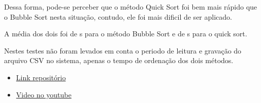 \documentclass[12pt]{article}
\begin{document}
Dessa forma, pode-se perceber que o método Quick Sort foi bem mais rápido que o Bubble Sort 
nesta situação, contudo, ele foi mais dificil de ser aplicado.

A média dos dois foi de \mediaBubble  s para o método Bubble Sort e de \mediaQuick  s para o quick sort.

Nestes testes não foram levados em conta o periodo de leitura e gravação do arquivo CSV no sistema, apenas o tempo de ordenação dos dois métodos.
\begin{itemize}
  \item\href{https://www.github.com/theluanz/projeto-busca}{Link repositório}
  \item \href{https://youtu.be/HtSkXQkIiSA}{Video no youtube}
\end{itemize}
\end{document}
